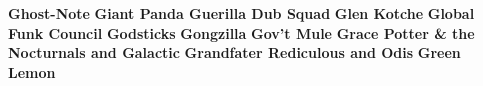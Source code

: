 \noindent \textbf{Ghost-Note}\newline
\vspace{10pt} 
\newline
\vspace{10pt} 
\noindent \textbf{Giant Panda Guerilla Dub Squad}\newline
\vspace{10pt} 
\newline
\vspace{10pt} 
\noindent \textbf{Glen Kotche}\newline
\vspace{10pt} 
\newline
\vspace{10pt} 
\noindent \textbf{Global Funk Council}\newline
\vspace{10pt} 
\newline
\vspace{10pt} 
\noindent \textbf{Godsticks}\newline
\vspace{10pt} 
\newline
\vspace{10pt} 
\noindent \textbf{Gongzilla}\newline
\vspace{10pt} 
\newline
\vspace{10pt} 
\noindent \textbf{Gov't Mule}\newline
\vspace{10pt} 
\newline
\vspace{10pt} 
\noindent \textbf{Grace Potter \& the Nocturnals and Galactic}\newline
\vspace{10pt} 
\newline
\vspace{10pt} 
\noindent \textbf{Grandfater Rediculous and Odis}\newline
\vspace{10pt} 
\newline
\vspace{10pt} 
\noindent \textbf{Green Lemon}\newline
